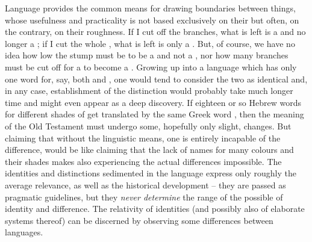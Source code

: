 
\pa\label{pa:language} Language provides the common means for drawing boundaries
between things, whose usefulness and practicality is not based exclusively on
their  but often, on the contrary, on their roughness. If I cut
off the branches, what is left is a  and no longer a ; if I
cut the whole , what is left is only a .  But, of course,
we have no  idea how low the stump must be to be a  and
not a , nor how many branches must be cut off for a  to
become a .  Growing up into a language which has only one word for,
say, both  and , one would tend to consider the two as
identical and, in any case,  establishment of the distinction
would probably take much longer time and might even appear as a deep discovery.
If eighteen or so Hebrew words for different shades of  get
translated by the same Greek word , then the meaning of the
Old Testament must undergo some, hopefully only slight, changes.
But claiming that without the linguistic means, one is entirely incapable of
 the difference, would be like claiming that the lack of names
for many colours and their shades makes also experiencing the actual differences
impossible. The identities and distinctions sedimented in the language express
only roughly the average relevance, as well as the historical development --
they are passed as pragmatic guidelines, but they {\em never determine} the
range of the possible  of identity and difference.  The relativity of identities (and possibly also of
elaborate systems thereof) can be discerned by observing some differences
between languages.


